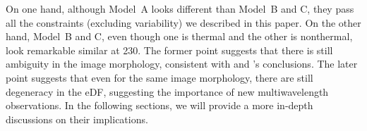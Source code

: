 On one hand, although Model~A looks different than Model~B and C, they
pass all the constraints (excluding variability) we described in this
paper.
On the other hand, Model~B and C, even though one is thermal and the
other is nonthermal, look remarkable similar at 230\GHz.
The former point suggests that there is still ambiguity in the image
morphology, consistent with  and
's conclusions.
The later point suggests that even for the same image morphology,
there are still degeneracy in the eDF, suggesting the importance of
new multiwavelength observations.
In the following sections, we will provide a more in-depth discussions
on their implications.
